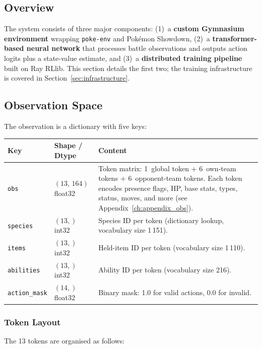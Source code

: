 \subsection{Overview}

The system consists of three major components: (1)~a \textbf{custom Gymnasium
environment} wrapping \texttt{poke-env} and Pok\'{e}mon Showdown, (2)~a
\textbf{transformer-based neural network} that processes battle observations
and outputs action logits plus a state-value estimate, and (3)~a
\textbf{distributed training pipeline} built on Ray RLlib.  This section
details the first two; the training infrastructure is covered in
Section~\ref{sec:infrastructure}.

\subsection{Observation Space}

The observation is a dictionary with five keys:

\begin{center}
\small
\begin{tabularx}{\textwidth}{l l X}
  \toprule
  \textbf{Key} & \textbf{Shape / Dtype} & \textbf{Content} \\
  \midrule
  \texttt{obs}          & $(13,\,164)$ float32 &
    Token matrix: 1~global token + 6~own-team tokens + 6~opponent-team
    tokens.  Each token encodes presence flags, HP, base stats, types,
    status, moves, and more (see Appendix~\ref{ch:appendix_obs}). \\
  \texttt{species}      & $(13,)$ int32 &
    Species ID per token (dictionary lookup, vocabulary size 1\,151). \\
  \texttt{items}        & $(13,)$ int32 &
    Held-item ID per token (vocabulary size 1\,110). \\
  \texttt{abilities}    & $(13,)$ int32 &
    Ability ID per token (vocabulary size 216). \\
  \texttt{action\_mask} & $(14,)$ float32 &
    Binary mask: 1.0 for valid actions, 0.0 for invalid. \\
  \bottomrule
\end{tabularx}
\end{center}

\subsubsection{Token Layout}

The 13 tokens are organised as follows:

